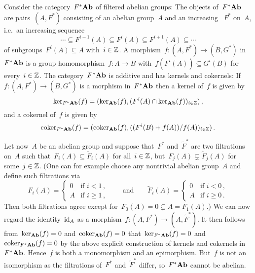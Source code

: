 \begin{example}
  Consider the category~$F^* \mathbf{Ab}$ of filtered abelian groups:
  The objects of~$F^* \mathbf{Ab}$ are pairs~$(A,F^*)$ consisting of an abelian group~$A$ and an increasing ~$F^*$ on~$A$, i.e.\ an increasing sequence
  \[
              \dotsb
    \subseteq F^{i-1}(A)
    \subseteq F^i(A)
    \subseteq F^{i+1}(A)
    \subseteq \dotsb
  \]
  of subgroups~$F^i(A) \subseteq A$ with~$i \in \mathbb{Z}$.
  A morphism~$f \colon (A, F^*) \to (B,G^*)$ in~$F^* \mathbf{Ab}$ is a group homomorphism~$f \colon A \to B$ with~$f(F^i(A)) \subseteq G^i(B)$ for every~$i \in \mathbb{Z}$.
  The category~$F^* \mathbf{Ab}$ is additive and has kernels and cokernels:
  If~$f \colon (A,F^*) \to (B,G^*)$ is a morphism in~$F^* \mathbf{Ab}$ then a kernel of~$f$ is given by
  \[
      \ker_{F^* \mathbf{Ab}}(f)
    = ( \ker_{\mathbf{Ab}}(f), ( F^i(A) \cap \ker_{\mathbf{Ab}}(f) )_{i \in \mathbb{Z}} ) \,,
  \]
  and a cokernel of~$f$ is given by
  \[
      \operatorname{coker}_{F^* \mathbf{Ab}}(f)
    = ( \operatorname{coker}_{\mathbf{Ab}}(f), ( (F^i(B) + f(A))/f(A) )_{i \in \mathbb{Z}} ) \,.
  \]
  
  Let now~$A$ be an abelian group and suppose that~$F^*$ and~$\tilde{F}^*$ are two filtrations on~$A$ such that~$F_i(A) \subseteq \tilde{F}_i(A)$ for all~$i \in \mathbb{Z}$, but~$F_j(A) \subsetneq \tilde{F}_j(A)$ for some~$j \in \mathbb{Z}$.
  (One can for example choose any nontrivial abelian group~$A$ and define such filtrations via
  \[
      F_i(A)
    = \begin{cases}
        0 & \text{if~$i < 1$} \,, \\
        A & \text{if~$i \geq 1$}  \,,
      \end{cases}
    \qquad\text{and}\qquad
      \tilde{F}_i(A)
    = \begin{cases}
        0 & \text{if~$i < 0$} \,, \\
        A & \text{if~$i \geq 0$}  \,.
      \end{cases}
  \]
  Then both filtrations agree except for~$F_0(A) = 0 \subsetneq A = F_1(A)$.)
  We can now regard the identity~$\operatorname{id}_A$ as a morphism~$f \colon (A, F^*) \to (A, \tilde{F}^*)$.
  It then follows from~$\ker_{\mathbf{Ab}}(f) = 0$ and~$\operatorname{coker}_{\mathbf{Ab}}(f) = 0$ that~$\ker_{F^* \mathbf{Ab}}(f) = 0$ and~$\operatorname{coker}_{F^* \mathbf{Ab}}(f) = 0$ by the above explicit construction of kernels and cokernels in~$F^* \mathbf{Ab}$.
  Hence~$f$ is both a monomorphism and an epimorphism.
  But~$f$ is not an isomorphism as the filtrations of~$F^*$ and~$\tilde{F}^*$ differ, so~$F^* \mathbf{Ab}$ cannot be abelian.
\end{example}















